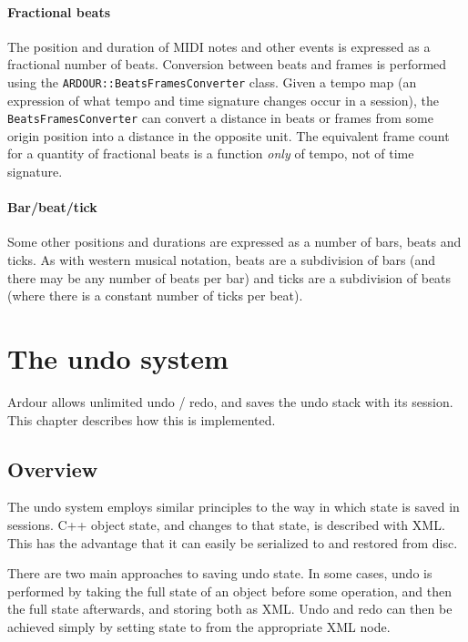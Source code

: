 \documentclass[10pt,a4paper]{book}
\newcommand{\code}[1]{\texttt{#1}}
\begin{document}
\subsubsection{Fractional beats}

The position and duration of MIDI notes and other events is expressed
as a fractional number of beats.  Conversion between beats and frames
is performed using the \code{ARDOUR::BeatsFramesConverter} class.
Given a tempo map (an expression of what tempo and time signature
changes occur in a session), the \code{BeatsFramesConverter} can
convert a distance in beats or frames from some origin position into a
distance in the opposite unit.  The equivalent frame count for a
quantity of fractional beats is a function \emph{only} of tempo, not
of time signature.


\subsubsection{Bar/beat/tick}

Some other positions and durations are expressed as a number of bars,
beats and ticks.  As with western musical notation, beats are a
subdivision of bars (and there may be any number of beats per bar) and
ticks are a subdivision of beats (where there is a constant number of
ticks per beat).




\chapter{The undo system}

Ardour allows unlimited undo / redo, and saves the undo stack with its
session.  This chapter describes how this is implemented.

\section{Overview}

The undo system employs similar principles to the way in which state
is saved in sessions.  C++ object state, and changes to that state, is
described with XML\@.  This has the advantage that it can easily be
serialized to and restored from disc.

There are two main approaches to saving undo state.  In some cases,
undo is performed by taking the full state of an object before some
operation, and then the full state afterwards, and storing both as
XML\@.  Undo and redo can then be achieved simply by setting state to
from the appropriate XML node.
\end{document}
